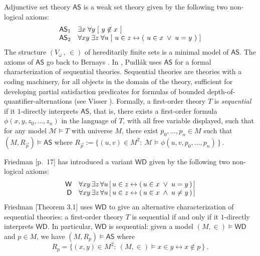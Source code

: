 \documentclass[10pt,a4paper, openany,  oldfontcommands]{memoir}
\newtheorem{open problem} [theorem] {Open Problem}
\begin{document}
Adjunctive set theory   $  \mathsf{AS} $    is  a  weak set theory given by the following two non-logical axioms: 
\[
\begin{array}{r l  c  c r l  }
\mathsf{AS}_1 
& 
 \exists x  \;  \forall y   \;   [    \   y \not\in x    \   ]   
\\
\mathsf{AS}_2 
& 
 \forall x y   \;  \exists z  \;    \forall u   \;   [    \   u \in z  \leftrightarrow   (    \    u \in x   \;  \vee   \;    u  =  y     \    )      \      ]    
 \end{array}
\] 
The structure  $  \left(  V_{  \omega }   \,  ,  \,   \in  \right)  $  of  hereditarily finite sets  is  a minimal model of  $  \mathsf{AS} $. 
The axioms of  $  \mathsf{AS} $  go back to   Bernays     \cite{Barnays1937}. 
 In \cite{Pudlak1983},    Pudlák  uses $  \mathsf{AS} $  for  a formal characterization of   sequential   theories.
 Sequential  theories are   theories with a coding machinery, for  all objects in the domain of the theory,    sufficient for developing 
partial  satisfaction predicates for formulas of bounded depth-of-quantifier-alternations  (see Visser \cite{Visser2019}). 
Formally, a first-order theory  $T$ is  \emph{sequential}   if it  $1$-directly interprets  $  \mathsf{AS} $, that is, 
there exists a  first-order formula  $  \phi ( x, y, z_0,  \ldots , z_n ) $  in the language of  $T$, 
with all free variable displayed,  such that   for any model $  \mathcal{M} \models  T $   with universe $  M$,  
there exist  $  p_0,  \ldots , p_n  \in M  $  such that 
   $  ( M, R_{  \vec{p}  } )  \models    \mathsf{AS}  $  where 
   $  R_{  \vec{p} }  :=  \lbrace (u, v )  \in  M^2  :   \   \mathcal{M} \models  \phi  (u, v , p_0,  \ldots  , p_n  )  \,  \rbrace     \,  $.







  Friedman \cite{Friedman2007}[p.~17] has introduced a variant $  \mathsf{WD} $  given by the following two non-logical axioms: 
\[
\begin{array}{r l  c  c r l  }
\mathsf{W}
& 
\forall x y   \,  \exists z  \,    \forall u   \left[    \,   u  \in z  \leftrightarrow   (    \,    u \in x   \;  \vee   \;    u  =  y     \,    )      \,      \right] 
\\
\mathsf{D} 
& 
  \forall x y   \,  \exists z  \,    \forall u   \left[     \,   u \in z  \leftrightarrow   (    \,    u  \in x   \;  \wedge   \;    u  \neq  y     \,    )      \,      \right]       
 \end{array}
\] 
  Friedman \cite{Friedman2007}[Theorem 3.1]  uses $  \mathsf{WD} $  to give an alternative characterization of sequential theories: 
   a first-order theory  $T$ is   sequential   if and only if  it $1$-directly interprets  $  \mathsf{WD} $.
In particular,  $  \mathsf{WD} $ is sequential: 
given  a model  $   \left( M,  \in  \right)   \models  \mathsf{WD} $  and  $  p  \in  M  $, 
we have  $  \left(  M,  R_p \right)   \models   \mathsf{AS} $  where  
\[
  R_p =  \lbrace    (x, y )  \in  M^2  :   \    \left( M,  \in  \right)   \models    x  \in  y  \leftrightarrow   x  \not\in p    \,   \rbrace      
\       .
\]
\end{document}
